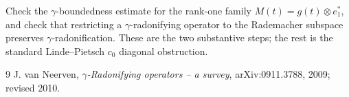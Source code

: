 \documentclass[11pt]{article}
\begin{document}
Check the \(\gamma\)-boundedness estimate for the rank-one family
\(M(t)=g(t)\otimes e_1^*\), and check that restricting a
\(\gamma\)-radonifying operator to the Rademacher subspace preserves
\(\gamma\)-radonification.  These are the two substantive steps; the rest is
the standard Linde--Pietsch \(c_0\) diagonal obstruction.

\begin{thebibliography}{9}
J. van Neerven,
\emph{\(\gamma\)-Radonifying operators -- a survey},
arXiv:0911.3788, 2009; revised 2010.
\end{thebibliography}
\end{document}
